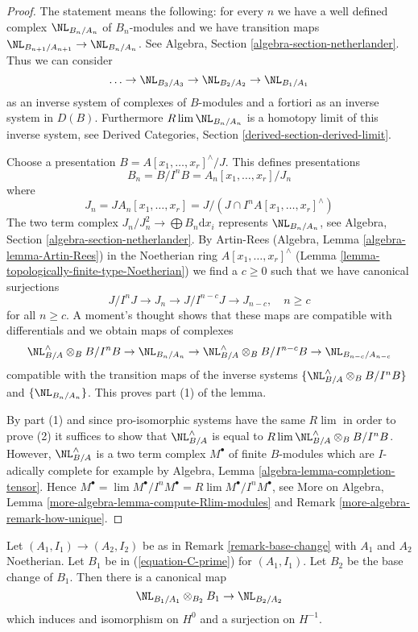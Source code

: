 \begin{proof}
The statement means the following: for every $n$ we have a well
defined complex $\NL_{B_n/A_n}$ of $B_n$-modules and we have
transition maps $\NL_{B_{n + 1}/A_{n + 1}} \to \NL_{B_n/A_n}$.
See Algebra, Section \ref{algebra-section-netherlander}.
Thus we can consider
$$
\ldots \to \NL_{B_3/A_3} \to \NL_{B_2/A_2} \to \NL_{B_1/A_1}
$$
as an inverse system of complexes of $B$-modules and a fortiori as
an inverse system in $D(B)$. Furthermore $R\lim \NL_{B_n/A_n}$
is a homotopy limit of this inverse system, see
Derived Categories, Section \ref{derived-section-derived-limit}.

\medskip\noindent
Choose a presentation $B = A[x_1, \ldots, x_r]^\wedge / J$. This
defines presentations
$$
B_n = B/I^nB = A_n[x_1, \ldots, x_r]/J_n
$$
where
$$
J_n = JA_n[x_1, \ldots, x_r] =
J/(J \cap I^nA[x_1, \ldots, x_r]^\wedge)
$$
The two term complex $J_n/J_n^2 \longrightarrow \bigoplus B_n \text{d}x_i$
represents $\NL_{B_n/A_n}$, see
Algebra, Section \ref{algebra-section-netherlander}.
By Artin-Rees (Algebra, Lemma \ref{algebra-lemma-Artin-Rees})
in the Noetherian ring $A[x_1, \ldots, x_r]^\wedge$
(Lemma \ref{lemma-topologically-finite-type-Noetherian})
we find a $c \geq 0$ such that we have canonical surjections
$$
J/I^nJ \to J_n \to J/I^{n - c}J \to J_{n - c},\quad n \geq c
$$
for all $n \geq c$. A moment's thought shows that these maps are
compatible with differentials and we obtain maps of complexes
$$
\NL_{B/A}^\wedge \otimes_B B/I^nB \to
\NL_{B_n/A_n} \to
\NL_{B/A}^\wedge \otimes_B B/I^{n - c}B \to
\NL_{B_{n - c}/A_{n - c}}
$$
compatible with the transition maps of the inverse systems
$\{\NL_{B/A}^\wedge \otimes_B B/I^nB\}$ and $\{\NL_{B_n/A_n}\}$.
This proves part (1) of the lemma.

\medskip\noindent
By part (1) and since pro-isomorphic
systems have the same $R\lim$ in order to prove (2)
it suffices to show that $\NL_{B/A}^\wedge$ is
equal to $R\lim \NL_{B/A}^\wedge \otimes_B B/I^nB$.
However, $\NL_{B/A}^\wedge$ is a two term complex $M^\bullet$
of finite $B$-modules which are $I$-adically complete for example by
Algebra, Lemma \ref{algebra-lemma-completion-tensor}. Hence
$M^\bullet = \lim M^\bullet/I^nM^\bullet = R\lim M^\bullet/I^n M^\bullet$, see
More on Algebra, Lemma \ref{more-algebra-lemma-compute-Rlim-modules} and
Remark \ref{more-algebra-remark-how-unique}.
\end{proof}

\begin{lemma}
\label{lemma-NL-base-change}
Let $(A_1, I_1) \to (A_2, I_2)$ be as in
Remark \ref{remark-base-change} with $A_1$ and $A_2$ Noetherian.
Let $B_1$ be in (\ref{equation-C-prime}) for $(A_1, I_1)$.
Let $B_2$ be the base change of $B_1$. Then there is a canonical map
$$
\NL_{B_1/A_1} \otimes_{B_2} B_1 \to \NL_{B_2/A_2}
$$
which induces and isomorphism on $H^0$ and a surjection on $H^{-1}$.
\end{lemma}

